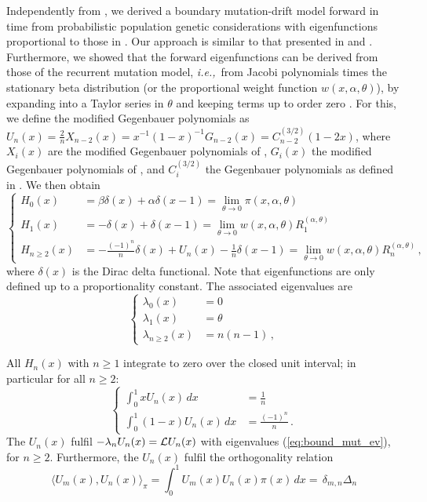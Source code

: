 \documentclass[preprint]{elsarticle}
\newcommand\ie{{\it i.e.,}}
\begin{document}
Independently from \citet{Tran14b}, we derived a boundary mutation-drift model forward in time from probabilistic population genetic considerations \citep{Vogl15} with eigenfunctions proportional to those in \citet{Tran14b}. Our approach is similar to that presented in \citet{McKa07} and \citet{Waxm11}. Furthermore, we showed that the forward eigenfunctions can be derived from those of the recurrent mutation model, \ie\ from Jacobi polynomials times the stationary beta distribution (or the proportional weight function $w(x,\alpha,\theta)$), by expanding into a Taylor series in $\theta$ and keeping terms up to order zero \citep[][Appendix A.1]{Vogl16}. For this, we define the modified Gegenbauer polynomials as  $U_n(x)=\frac{2}{n}X_{n-2}(x)=x^{-1}(1-x)^{-1}G_{n-2}(x)=C_{n-2}^{(3/2)}(1-2x)$, where $X_i(x)$ are the modified Gegenbauer polynomials of \citet{Tran14b}, $G_i(x)$ the modified Gegenbauer polynomials of \citet{Song12}, and $C_{i}^{(3/2)}$ the Gegenbauer polynomials as defined in  \citep{Abra70}. We then obtain
\begin{equation}\label{eq:forw_Us}
\begin{cases}
    H_0(x)&=\beta\delta(x)+\alpha\delta(x-1)=\lim_{\theta\to0}\pi(x,\alpha,\theta)\\
    H_1(x)&=-\delta(x)+\delta(x-1)=\lim_{\theta\to0}w(x,\alpha,\theta)R_1^{(\alpha,\theta)}\\
    H_{n\geq2}(x)&=-\frac{(-1)^n}n\delta(x)+U_n(x)-\frac{1}n\delta(x-1)=\lim_{\theta\to0}w(x,\alpha,\theta)R_n^{(\alpha,\theta)}\,,
\end{cases}
\end{equation}
where $\delta(x)$ is the Dirac delta functional. Note that eigenfunctions are only defined up to a proportionality constant. The associated eigenvalues are 
\begin{equation}\label{eq:bound_mut_ev}
\begin{cases}
    \lambda_0(x)&=0\\
    \lambda_1(x)&=\theta\\
    \lambda_{n\geq2}(x)&=n(n-1)\,,
\end{cases}
\end{equation}

All $H_n(x)$ with $n\geq 1$ integrate to zero over the closed unit interval; in particular for all $n\geq2$:
\begin{equation}\label{eq:int_U_n}
\begin{cases}
    \int_0^1 xU_n(x)\,dx&= \frac{1}n\\
    \int_0^1 (1-x)U_n(x)\,dx&= \frac{(-1)^n}n\,.
\end{cases} 
\end{equation}
The $U_n(x)$ fulfil $-\lambda_n U_n(x)={\cal L}U_n(x)$ with eigenvalues (\ref{eq:bound_mut_ev}), for $n\geq 2$. Furthermore, the $U_n(x)$ fulfil the orthogonality relation
\begin{equation}
    \langle U_m(x), U_n(x) \rangle_{\pi}=\int_0^1 U_m(x) U_n(x) \pi(x)\,dx=\, \delta_{m,n} \Delta_n
\end{equation} 
\end{document}
